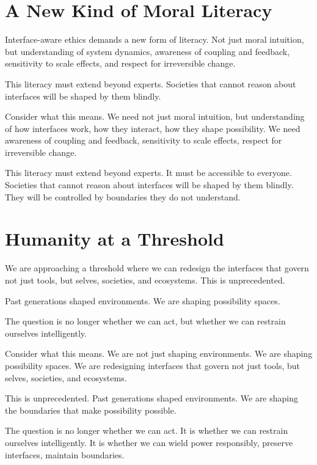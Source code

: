 \documentclass[
  openright]{book}
\begin{document}
\section{A New Kind of Moral
Literacy}\label{a-new-kind-of-moral-literacy}

Interface-aware ethics demands a new form of literacy. Not just moral
intuition, but understanding of system dynamics, awareness of coupling
and feedback, sensitivity to scale effects, and respect for irreversible
change.

This literacy must extend beyond experts. Societies that cannot reason
about interfaces will be shaped by them blindly.

Consider what this means. We need not just moral intuition, but
understanding of how interfaces work, how they interact, how they shape
possibility. We need awareness of coupling and feedback, sensitivity to
scale effects, respect for irreversible change.

This literacy must extend beyond experts. It must be accessible to
everyone. Societies that cannot reason about interfaces will be shaped
by them blindly. They will be controlled by boundaries they do not
understand.

\section{Humanity at a Threshold}\label{humanity-at-a-threshold}

We are approaching a threshold where we can redesign the interfaces that
govern not just tools, but selves, societies, and ecosystems. This is
unprecedented.

Past generations shaped environments. We are shaping possibility spaces.

The question is no longer whether we can act, but whether we can
restrain ourselves intelligently.

Consider what this means. We are not just shaping environments. We are
shaping possibility spaces. We are redesigning interfaces that govern
not just tools, but selves, societies, and ecosystems.

This is unprecedented. Past generations shaped environments. We are
shaping the boundaries that make possibility possible.

The question is no longer whether we can act. It is whether we can
restrain ourselves intelligently. It is whether we can wield power
responsibly, preserve interfaces, maintain boundaries.
\end{document}
